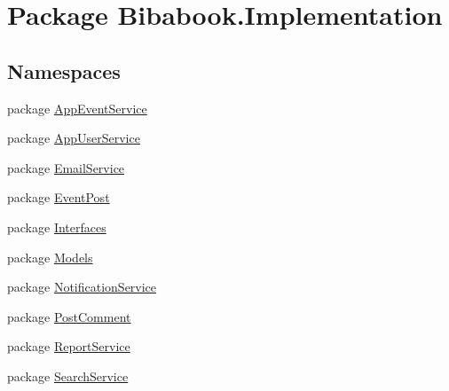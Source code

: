 \hypertarget{namespace_bibabook_1_1_implementation}{}\section{Package Bibabook.\+Implementation}
\label{namespace_bibabook_1_1_implementation}
\subsection*{Namespaces}
\begin{DoxyCompactItemize}
\item 
package \hyperlink{namespace_bibabook_1_1_implementation_1_1_app_event_service}{App\+Event\+Service}
\item 
package \hyperlink{namespace_bibabook_1_1_implementation_1_1_app_user_service}{App\+User\+Service}
\item 
package \hyperlink{namespace_bibabook_1_1_implementation_1_1_email_service}{Email\+Service}
\item 
package \hyperlink{namespace_bibabook_1_1_implementation_1_1_event_post}{Event\+Post}
\item 
package \hyperlink{namespace_bibabook_1_1_implementation_1_1_interfaces}{Interfaces}
\item 
package \hyperlink{namespace_bibabook_1_1_implementation_1_1_models}{Models}
\item 
package \hyperlink{namespace_bibabook_1_1_implementation_1_1_notification_service}{Notification\+Service}
\item 
package \hyperlink{namespace_bibabook_1_1_implementation_1_1_post_comment}{Post\+Comment}
\item 
package \hyperlink{namespace_bibabook_1_1_implementation_1_1_report_service}{Report\+Service}
\item 
package \hyperlink{namespace_bibabook_1_1_implementation_1_1_search_service}{Search\+Service}
\end{DoxyCompactItemize}
